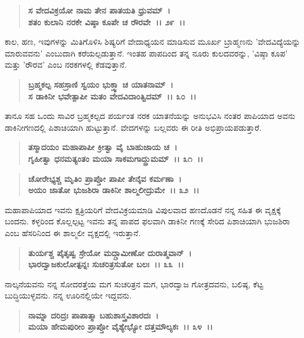 \begin{verse}
\textbf{ಸ ವೇದವಿಕ್ರಯೋ ನಾಮ ತೇನ ಪಾತಯತಿ ಧ್ರುವಮ್~।}\\\textbf{ಶತಂ ಕುಲಾನಿ ನರಕೇ ವಿಷ್ಠಾ ಕೂಪೇ ಚ ರೌರವೇ~।। ೨೯~।।}
\end{verse}

ಕಾಲ, ಹಣ, ಇವುಗಳನ್ನು ಮಿತಿಗೊಳಿಸಿ ಶಿಷ್ಯರಿಗೆ ವೇದಾಧ್ಯಯನ ಮಾಡಿಸುವ ಮೂರ್ಖ ಬ್ರಾಹ್ಮಣನು 'ವೇದವಿದ್ಯೆಯನ್ನು ಮಾರುವವನು' ಎಂಬುದಾಗಿ ಕರೆಯಲ್ಪಡುತ್ತಾನೆ. ಇಂತಹ ಪಾಪದಿಂದ ತನ್ನ ನೂರು ಕುಲದವರನ್ನು, 'ವಿಷ್ಠಾ ಕೂಪ' ಮತ್ತು 'ರೌರವ' ಎಂಬ ನರಕಗಳಲ್ಲಿ ಕೆಡವುತ್ತಾನೆ.

\begin{verse}
\textbf{ಬ್ರಹ್ಮಕಲ್ಪ ಸಹಸ್ರಾಣಿ ಸ್ವಯಂ ಭುಕ್ತ್ವಾ ಚ ಯಾತನಾಮ್~।}\\\textbf{ಸ ಡಾಕಿನೀ ಭವೇತ್ಪಾಪೀ ಮತಂ ವೇದವಿದಾಂತ್ವಿದಮ್~।। ೩೦~।।}
\end{verse}

ತಾನೂ ಸಹ ಒಂದು ಸಾವಿರ ಬ್ರಹ್ಮಕಲ್ಪದ ಪರ್ಯಂತ ನರಕ ಯಾತನೆಯನ್ನು ಅನುಭವಿಸಿ ನಂತರ ಪಾಪಿಯಾದ ಅವನು ಡಾಕಿನೀಗಣದಲ್ಲಿ ಪಿಶಾಚಿಯಾಗಿ ಹುಟ್ಟುತ್ತಾನೆ. ವೇದಗಳನ್ನು ಬಲ್ಲವರು ಈ ರೀತಿ ಅಭಿಪ್ರಾಯಪಡುತ್ತಾರೆ.

\begin{verse}
\textbf{ತಸ್ಮಾದಯಂ ಮಹಾಪಾಪೀ ಕ್ರೀತ್ವಾ ವೈ ಬಾಹುಜಾಯ ಚ~।}\\\textbf{ಗೃಹೀತ್ವಾ ಧನಮತ್ಯಂತಂ ಮಯಾ ಸಾಕಮಗಾದ್ದ್ರುಮಮ್~।। ೩೧~।। }
\end{verse}

\begin{verse}
\textbf{ಚೋರೇಭ್ಯಶ್ಚ ಮೃತಿಂ ಪ್ರಾಪ್ತೋ ಪಾಪೀ ತೇನೈವ ಕರ್ಮಣಾ~।}\\\textbf{ಅಯಂ ಜಾತೋ ಭುಜಶಿರಾ ಡಾಕಿನೀ ಶಾಲ್ಮಲೀದ್ರುಮೇ~।। ೩೨~।।}
\end{verse}

ಮಹಾಪಾಪಿಯಾದ ಇವನು ಕ್ಷತ್ರಿಯರಿಗೆ ವೇದವಿಕ್ರಯಮಾಡಿ ವಿಪುಲವಾದ ಹಣದೊಡನೆ ನನ್ನ ಸಹಿತ ಈ ವೃಕ್ಷಕ್ಕೆ ಬಂದನು. ಕಳ್ಳರಿಂದ ಕೊಲ್ಲಲ್ಪಟ್ಟ ಇವನು ತನ್ನ ಪಾಪದ ಫಲವಾಗಿ ಡಾಕಿನೀ ಗಣಕ್ಕೆ ಸೇರಿದ ಪಿಶಾಚಿಯಾಗಿ ಭುಜಶಿರಾ ಎಂಬ ಹೆಸರಿನಿಂದ ಈ ಶಾಲ್ಮಲೀ ವೃಕ್ಷದಲ್ಲಿ ಇರುತ್ತಾನೆ.

\begin{verse}
\textbf{ತುರ್ಯಶ್ಚ ಪೈತೃಷ್ವ ಸ್ರೇಯೋ ಮದ್ಗ್ರಾಮೀಣೋ ದುರಾತ್ಮವಾನ್~।}\\\textbf{ಭಾರದ್ವಾಜಕುಲೋತ್ಪನ್ನಃ ಸುಚರಿತ್ರಸುತೋ ಬಲಃ~।। ೩೩~।।}
\end{verse}

ನಾಲ್ಕನೆಯವನು ನನ್ನ ಸೋದರತ್ತೆಯ ಮಗ ಸುಚರಿತ್ರನ ಮಗ, ಭಾರದ್ವಾಜ ಗೋತ್ರದವನು, ಬಲಿಷ್ಠ, ಕೆಟ್ಟ ಬುದ್ಧಿಯುಳ್ಳವನು. ನನ್ನ ಊರಿನಲ್ಲಿಯೇ ಇದ್ದವನು.

\begin{verse}
\textbf{ನಾಮ್ನಾ ದರಿದ್ರಃ ಪಾಪಾತ್ಮಾ ಬಹುಶಾಸ್ತ್ರವಿಶಾರದಃ~।}\\\textbf{ಮಯಾ ಹೇಮಪುರೀಂ ಪ್ರಾಪ್ತೋ ವೈಶ್ಯೇಭ್ಯೋ ದತ್ತಮೌಲ್ಯಕಃ~।। ೩೪~।।} 
\end{verse}

